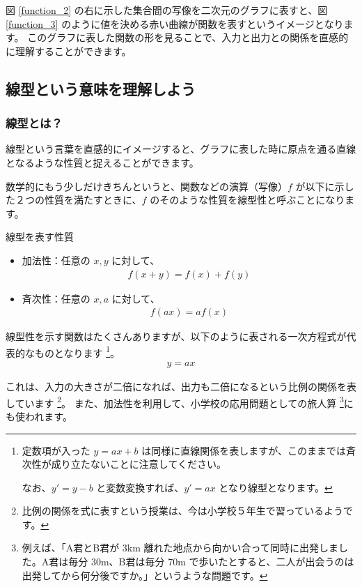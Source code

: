 \documentclass[uplatex,dvipdfmx,a4paper,11pt]{jsarticle}
\begin{document}
図 \ref{function_2} の右に示した集合間の写像を二次元のグラフに表すと、図 \ref{function_3} のように値を決める赤い曲線が関数を表すというイメージとなります。
このグラフに表した関数の形を見ることで、入力と出力との関係を直感的に理解することができます。

\subsection{線型という意味を理解しよう}

\subsubsection{線型とは？}
線型という言葉を直感的にイメージすると、グラフに表した時に原点を通る直線となるような性質と捉えることができます。

数学的にもう少しだけきちんというと、関数などの演算（写像）$f$ が以下に示した２つの性質を満たすときに、$f$ のそのような性質を線型性と呼ぶことになります。
\large
\begin{itembox}[l]{線型を表す性質}
	\begin{itemize}
		\item 加法性：任意の $x,y$ に対して、
		\begin{align*}
			f(x+y)=f(x)+f(y)
		\end{align*}
		\item 斉次性：任意の $x,a$ に対して、
		\begin{align*}
			f(ax)=af(x)
		\end{align*}
	\end{itemize}
\end{itembox}
\normalsize

線型性を示す関数はたくさんありますが、以下のように表される一次方程式が代表的なものとなります
\footnote{
	定数項が入った $y=ax+b$ は同様に直線関係を表しますが、このままでは斉次性が成り立たないことに注意してください。

	なお、$y'=y-b$ と変数変換すれば、$y'=ax$ となり線型となります。
}。
\begin{align*}
	y=ax
\end{align*}

これは、入力の大きさが二倍になれば、出力も二倍になるという比例の関係を表しています
\footnote{
	比例の関係を式に表すという授業は、今は小学校５年生で習っているようです。
}。
また、加法性を利用して、小学校の応用問題としての旅人算
\footnote{
	例えば、「A君とB君が 3km 離れた地点から向かい合って同時に出発しました。A君は毎分 30m、B君は毎分 70m で歩いたとすると、二人が出会うのは出発してから何分後ですか。」というような問題です。
}にも使われます。
\end{document}
